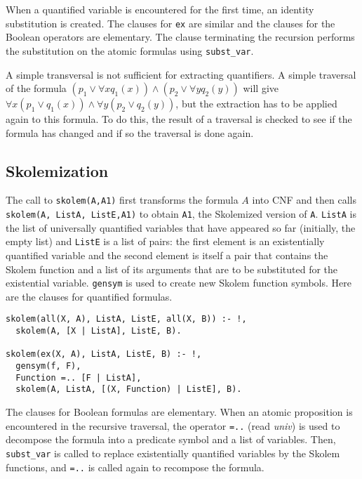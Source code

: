 \documentclass[11pt]{article}
\newcommand*{\p}[1]{\textup{\texttt{#1}}}
\begin{document}
When a quantified variable is encountered for the first time, an
identity substitution is created. The clauses for \p{ex} are similar and
the clauses for the Boolean operators are elementary. The clause
terminating the recursion performs the substitution on the atomic
formulas using \p{subst\_var}.

A simple transversal is not sufficient for extracting quantifiers. A
simple traversal of the formula $(p_{1} \vee \forall xq_{1}(x)) \wedge
(p_{2} \vee \forall yq_{2}(y))$ will give $\forall x(p_{1} \vee
q_{1}(x)) \wedge \forall y(p_{2} \vee q_{2}(y))$, but the extraction has
to be applied again to this formula. To do this, the result of a
traversal is checked to see if the formula has changed and if so the
traversal is done again.




\subsection{Skolemization}\label{s.skolem}

The call to \p{skolem(A,A1)} first transforms the formula $A$ into CNF
and then calls \p{skolem(A, ListA, ListE,A1)} to obtain \p{A1}, the
Skolemized version of \p{A}. \p{ListA} is the list of universally
quantified variables that have appeared so far (initially, the empty
list) and \p{ListE} is a list of pairs: the first element is an
existentially quantified variable and the second element is itself a
pair that contains the Skolem function and a list of its arguments that
are to be substituted for the existential variable. \p{gensym} is used
to create new Skolem function symbols. Here are the clauses for
quantified formulas.

\begin{verbatim}
skolem(all(X, A), ListA, ListE, all(X, B)) :- !,
  skolem(A, [X | ListA], ListE, B).

skolem(ex(X, A), ListA, ListE, B) :- !,
  gensym(f, F),
  Function =.. [F | ListA],    
  skolem(A, ListA, [(X, Function) | ListE], B).
\end{verbatim}

The clauses for Boolean formulas are elementary. When an atomic
proposition is encountered in the recursive traversal,
the operator \p{=..} (read \emph{univ}) is used to decompose the formula
into a predicate symbol and a list of variables. Then, \p{subst\_var} is
called to replace existentially quantified variables by the Skolem
functions, and \p{=..} is called again to recompose the formula.
\end{document}
